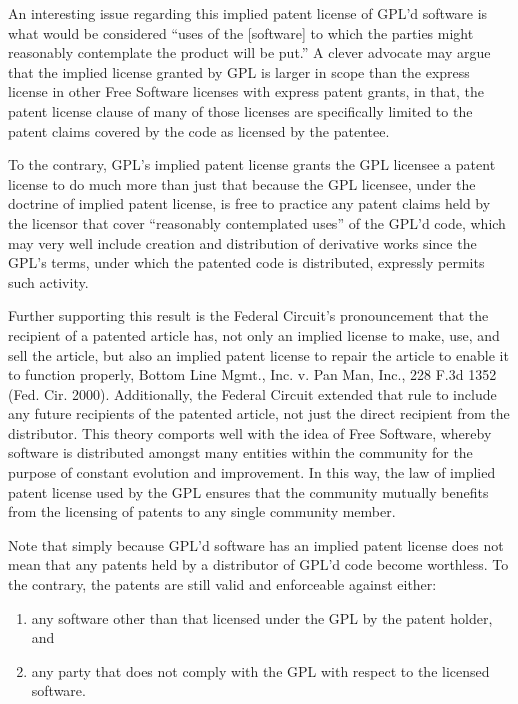 \documentclass[11pt, letterpaper]{book}
\begin{document}
An interesting issue regarding this implied patent license of GPL'd
software is what would be considered ``uses of the [software] to which
the parties might reasonably contemplate the product will be put.'' A
clever advocate may argue that the implied license granted by GPL is
larger in scope than the express license in other Free Software
licenses with express patent grants, in that, the patent license
clause of many of those licenses are specifically limited to the
patent claims covered by the code as licensed by the patentee.

To the contrary, GPL's implied patent license grants the GPL licensee a
patent license to do much more than just that because the GPL licensee,
under the doctrine of implied patent license, is free to practice any
patent claims held by the licensor that cover ``reasonably contemplated
uses'' of the GPL'd code, which may very well include creation and
distribution of derivative works since the GPL's terms, under which the
patented code is distributed, expressly permits such activity.

Further supporting this result is the Federal Circuit's pronouncement that
the recipient of a patented article has, not only an implied license to
make, use, and sell the article, but also an implied patent license to
repair the article to enable it to function properly, Bottom Line Mgmt.,
Inc. v. Pan Man, Inc., 228 F.3d 1352 (Fed. Cir. 2000). Additionally, the
Federal Circuit extended that rule to include any future recipients of the
patented article, not just the direct recipient from the distributor.
This theory comports well with the idea of Free Software, whereby software
is distributed amongst many entities within the community for the purpose
of constant evolution and improvement. In this way, the law of implied
patent license used by the GPL ensures that the community mutually
benefits from the licensing of patents to any single community member.

Note that simply because GPL'd software has an implied patent license does
not mean that any patents held by a distributor of GPL'd code become
worthless. To the contrary, the patents are still valid and enforceable
against either:

\begin{enumerate}
 \renewcommand{\theenumi}{\alph{enumi}}
 \renewcommand{\labelenumi}{\textup{(\theenumi)}}

\item any software other than that licensed under the GPL by the patent
  holder, and

\item any party that does not comply with the GPL
with respect to the licensed software.
\end{enumerate}
\end{document}
